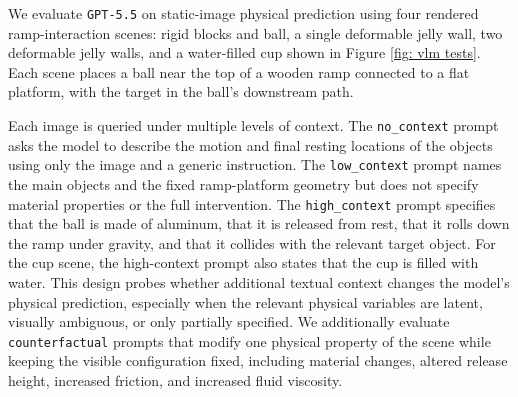 \documentclass{article}
\begin{document}




We evaluate \texttt{GPT-5.5} on static-image physical prediction using four rendered ramp-interaction scenes: rigid blocks and ball, a single deformable jelly wall, two deformable jelly walls, and a water-filled cup shown in Figure \ref{fig: vlm tests}. Each scene places a ball near the top of a wooden ramp connected to a flat platform, with the target in the ball’s downstream path. 

Each image is queried under multiple levels of context. The \texttt{no\_context} prompt asks the model to describe the motion and final resting locations of the objects using only the image and a generic instruction. The \texttt{low\_context} prompt names the main objects and the fixed ramp-platform geometry but does not specify material properties or the full intervention. The \texttt{high\_context} prompt specifies that the ball is made of aluminum, that it is released from rest, that it rolls down the ramp under gravity, and that it collides with the relevant target object. For the cup scene, the high-context prompt also states that the cup is filled with water. This design probes whether additional textual context changes the model's physical prediction, especially when the relevant physical variables are latent, visually ambiguous, or only partially specified.
We additionally evaluate \texttt{counterfactual} prompts that modify one physical property of the scene while keeping the visible configuration fixed, including material changes, altered release height, increased friction, and increased fluid viscosity.
\end{document}

